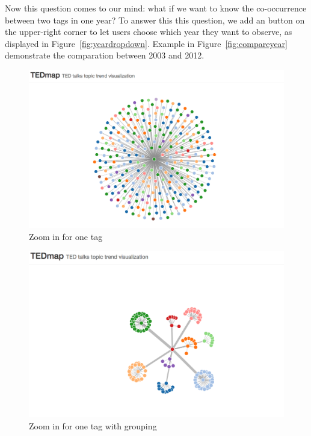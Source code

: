 \documentclass{report}
\numberwithin{figure}{section}
\begin{document}
\quad Now this question comes to our mind: what if we want to know the co-occurrence between two tags in one year? To answer this this question, we add an button on the upper-right corner to let users choose which year they want to observe, as displayed in Figure~\ref{fig:yeardropdown}. Example in Figure~\ref{fig:compareyear} demonstrate the comparation between 2003 and 2012.

\begin{figure}
\begin{center}
\includegraphics[scale=0.3]{focusOneTag_d1}
\caption{Zoom in for one tag}
\label{fig:zoomin1}
\end{center}
\end{figure}

\begin{figure}
\begin{center}
\includegraphics[scale=0.3]{focusOneTag_d2}
\caption{Zoom in for one tag with grouping}
\label{fig:zoomin2}
\end{center}
\end{figure}
\end{document}
